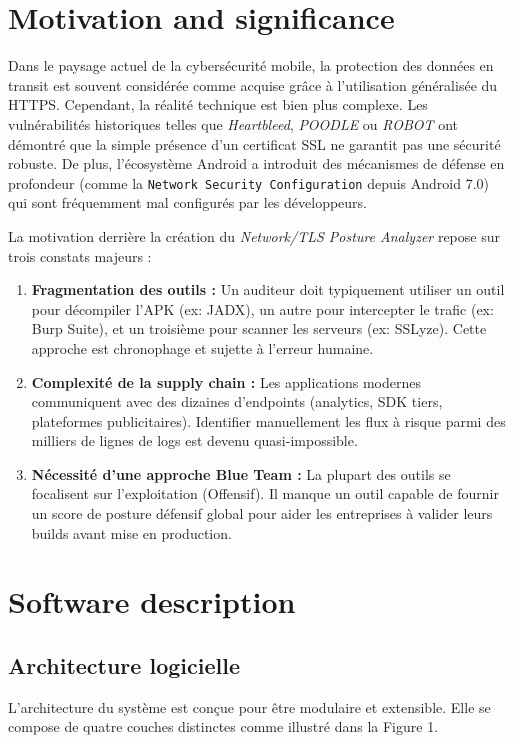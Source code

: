 \documentclass[11pt,a4paper]{article}
\begin{document}
\newpage

\section{Motivation and significance}
Dans le paysage actuel de la cybersécurité mobile, la protection des données en transit est souvent considérée comme acquise grâce à l'utilisation généralisée du HTTPS. Cependant, la réalité technique est bien plus complexe. Les vulnérabilités historiques telles que \textit{Heartbleed}, \textit{POODLE} ou \textit{ROBOT} ont démontré que la simple présence d'un certificat SSL ne garantit pas une sécurité robuste. De plus, l'écosystème Android a introduit des mécanismes de défense en profondeur (comme la \texttt{Network Security Configuration} depuis Android 7.0) qui sont fréquemment mal configurés par les développeurs.

La motivation derrière la création du \textit{Network/TLS Posture Analyzer} repose sur trois constats majeurs :
\begin{enumerate}
    \item \textbf{Fragmentation des outils :} Un auditeur doit typiquement utiliser un outil pour décompiler l'APK (ex: JADX), un autre pour intercepter le trafic (ex: Burp Suite), et un troisième pour scanner les serveurs (ex: SSLyze). Cette approche est chronophage et sujette à l'erreur humaine.
    \item \textbf{Complexité de la supply chain :} Les applications modernes communiquent avec des dizaines d'endpoints (analytics, SDK tiers, plateformes publicitaires). Identifier manuellement les flux à risque parmi des milliers de lignes de logs est devenu quasi-impossible.
    \item \textbf{Nécessité d'une approche Blue Team :} La plupart des outils se focalisent sur l'exploitation (Offensif). Il manque un outil capable de fournir un score de posture défensif global pour aider les entreprises à valider leurs builds avant mise en production.
\end{enumerate}

\section{Software description}

\subsection{Architecture logicielle}
L'architecture du système est conçue pour être modulaire et extensible. Elle se compose de quatre couches distinctes comme illustré dans la Figure 1.
\end{document}
